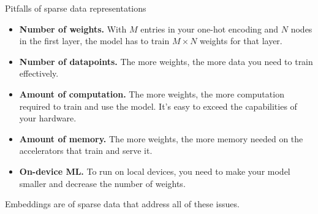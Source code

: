 \begin{frame}{Pitfalls of sparse data representations}
  \begin{withmargin}
    \begin{tdmain}
      \footnotesize
      \begin{itemize}
        \item \textbf{Number of weights.} With $M$ entries in your one-hot
          encoding and $N$ nodes in the first layer, the model has to train
          $M \times N$ weights for that layer.
        \item \textbf{Number of datapoints.} The more weights, the more data you
          need to train effectively.
        \item \textbf{Amount of computation.} The more weights, the more
          computation required to train and use the model. It's easy to exceed
          the capabilities of your hardware.
        \item \textbf{Amount of memory.} The more weights, the more memory
          needed on the accelerators that train and serve it.
        \item \textbf{On-device ML.} To run on local devices, you need to make
          your model smaller and decrease the number of weights.
      \end{itemize}
    \end{tdmain}
    \begin{tdmargin}
      \vfill
      Embeddings are  of sparse data
      that address all of these issues.
      \vfill
    \end{tdmargin}
  \end{withmargin}
\end{frame}


